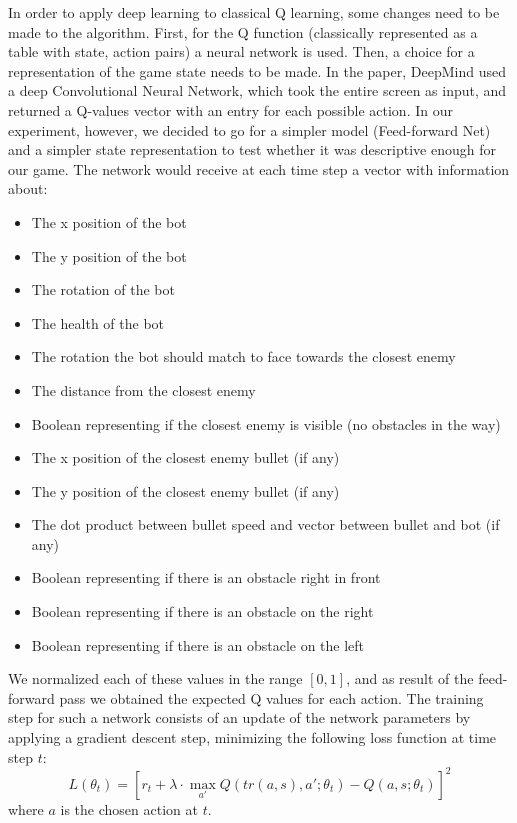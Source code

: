 \documentclass{article}
\begin{document}
	In order to apply deep learning to classical Q learning, some changes need to be made to the algorithm. First, for the Q function (classically represented as a table with state, action pairs) a neural network is used. Then, a choice for a representation of the game state needs to be made. In the paper, DeepMind used a deep Convolutional Neural Network, which took the entire screen as input, and returned a Q-values vector with an entry for each possible action. In our experiment, however, we decided to go for a simpler model (Feed-forward Net) and a simpler state representation to test whether it was descriptive enough for our game. The network would receive at each time step a vector with information about:
	\begin{itemize}
	    \item The x position of the bot
	    \item The y position of the bot
	    \item The rotation of the bot
	    \item The health of the bot
	    \item The rotation the bot should match to face towards the closest enemy
	    \item The distance from the closest enemy
	    \item Boolean representing if the closest enemy is visible (no obstacles in the way)
	    \item The x position of the closest enemy bullet (if any)
	    \item The y position of the closest enemy bullet (if any)
	    \item The dot product between bullet speed and vector between bullet and bot (if any)
	    \item Boolean representing if there is an obstacle right in front
	    \item Boolean representing if there is an obstacle on the right
	    \item Boolean representing if there is an obstacle on the left
	\end{itemize}
	We normalized each of these values in the range $[0,1]$, and as result of the feed-forward pass we obtained the expected Q values for each action. The training step for such a network consists of an update of the network parameters by applying a gradient descent step, minimizing the following loss function at time step $t$:
	\begin{equation}
	    L(\theta_t) = [r_t+\lambda\cdot\max_{a'}Q(tr(a,s),a';\theta_t) - Q(a,s;\theta_t)]^2
	\end{equation}
	where $a$ is the chosen action at $t$.
	
\end{document}
